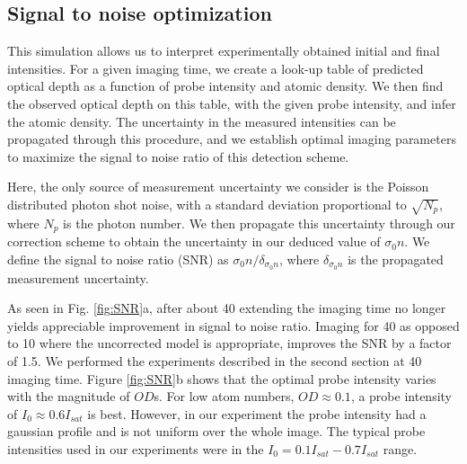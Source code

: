 \documentclass[12pt]{iopart}
\begin{document}
\subsection{Signal to noise optimization}
This simulation allows us to interpret experimentally obtained initial and final intensities. For a given imaging time, we create a look-up table of predicted optical depth as a function of probe intensity and atomic density. We then find the observed optical depth on this table, with the given probe intensity, and infer the atomic density. The uncertainty in the measured intensities can be propagated through this procedure, and we establish optimal imaging parameters to maximize the signal to noise ratio of this detection scheme. 
\par Here, the only source of measurement uncertainty we consider is the Poisson distributed photon shot noise, with a standard deviation proportional to $\sqrt{N_p}$, where $N_p$ is the photon number. We then propagate this uncertainty through our correction scheme to obtain the uncertainty in our deduced value of $\sigma_0 n$. We define the signal to noise ratio (SNR) as $\sigma_0 n/\delta_{\sigma_0 n}$, where $ \delta_{\sigma_0 n}$ is the propagated measurement uncertainty.
\par As seen in Fig. \ref{fig:SNR}a, after about 40\us{} extending the imaging time no longer yields appreciable improvement in signal to noise ratio. Imaging for 40\us{} as opposed to 10\us{} where the uncorrected model is appropriate, improves the SNR by a factor of  1.5. We performed the experiments described in the second section at 40\us{} imaging time. Figure \ref{fig:SNR}b shows that the optimal probe intensity varies with the magnitude of $OD$s. For low atom numbers, $OD\approx0.1$, a probe intensity of $I_0\approx0.6I_{sat}$ is best. However, in our experiment the probe intensity had a gaussian profile and is not uniform over the whole image.  The typical probe intensities used in our experiments were in the $I_0=0.1I_{sat}-0.7I_{sat}$  range.
\end{document}
